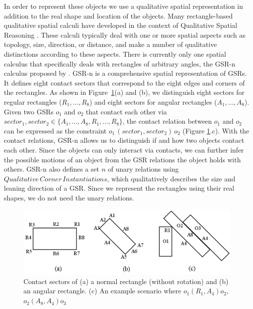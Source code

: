 \documentclass[letterpaper]{article}
\begin{document}
In order to represent these objects we use a qualitative spatial representation in addition to the real shape and location of the objects. 
% 
%
%
%
Many rectangle-based qualitative spatial calculi \cite{balbiani1998model,cohn2012thinking,sokeh2013efficient} have developed in the context of Qualitative Spatial Reasoning \cite{cohn2008qualitative}. These calculi typically deal with one or more spatial aspects such as topology, size, direction, or distance, and make a number of qualitative distinctions according to these aspects. There is currently only one spatial calculus that specifically deals with rectangles of arbitrary angles, the GSR-n calculus proposed by \cite{Ge2013}. GSR-n is a comprehensive spatial representation of GSRs. It defines eight contact sectors that correspond to the eight edges and corners of the rectangles. As shown in Figure~\ref{GSR}(a) and (b), we distinguish eight sectors for regular rectangles ($R_1,\ldots,R_8$) and eight sectors for angular rectangles ($A_1,\ldots,A_8$). Given two GSRs $o_1$ and $o_2$ that contact each other via $sector_1, sector_2 \in \{A_1, ..., A_8, R_1, ..., R_8\}$, the contact relation between $o_1$ and $o_2$ can be expressed as the constraint $o_1 \, (sector_1, sector_2) \, o_2$ (Figure \ref{GSR}.c). With the contact relations, GSR-n allows us to distinguish if and how two objects contact each other. Since the objects can only interact via contacts, we can further infer the possible motions of an object from the GSR relations the object holds with others. GSR-n also defines a set $n$ of unary relations using  $Qualitative\,Corner\,Instantiations$, which qualitatively describes the size and leaning direction of a GSR. Since we represent the rectangles using their real shapes, we do not need the unary relations. 
\begin{figure}[h!]
\centering\includegraphics[scale=0.25]{GSR.png}\caption{Contact sectors of (a) a normal rectangle (without rotation) and (b) an angular rectangle. (c) An example scenario where $o_1 (R_1, A_4) o_2$, $o_2 (A_8, A_4) o_3$}
\label{GSR}
\end{figure}
\end{document}
